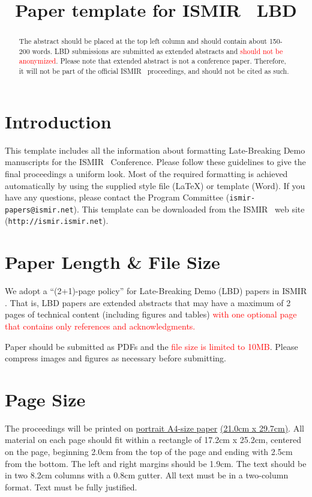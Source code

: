 \documentclass{article}
\title{Paper template for ISMIR \conferenceyear\ LBD}
\begin{document}
%
\maketitle
%
\begin{abstract}
The abstract should be placed at the top left column and should contain about 150-200 words. LBD submissions are submitted as extended abstracts and \textcolor{red}{should not be anonymized}. Please note that extended abstract is not a conference paper. Therefore, it will not be part of the official ISMIR \conferenceyear\ proceedings, and should not be cited as such.
\end{abstract}
%
\section{Introduction}\label{sec:introduction}

This template includes all the information about formatting Late-Breaking Demo manuscripts for the ISMIR \conferenceyear\ Conference. Please follow these guidelines to give the final proceedings a uniform look. Most of the required formatting is achieved automatically by using the supplied
style file (\LaTeX) or template (Word).
If you have any questions, please contact the Program Committee (\texttt{ismir\conferenceyear-papers@ismir.net}).
This template can be downloaded from the ISMIR \conferenceyear\ web site (\texttt{http://ismir\conferenceyear.ismir.net}).
%
\section{Paper Length \& File Size}
We adopt a ``(2+1)-page policy'' for Late-Breaking Demo (LBD) papers in ISMIR \conferenceyear. That is, LBD papers are extended abstracts that may have a maximum of 2 pages of technical content (including figures and tables) \textcolor{red}{with one optional page that contains only references and acknowledgments.}

Paper should be submitted as PDFs and the \textcolor{red}{file size is limited to 10MB}. Please compress images and figures as necessary before submitting.

\section{Page Size}\label{sec:page_size}

The proceedings will be printed on
 \underline{portrait A4-size paper} \underline{(21.0cm x 29.7cm)}.
All material on each page should fit within a rectangle of 17.2cm x 25.2cm,
centered on the page, beginning 2.0cm
from the top of the page and ending with 2.5cm from the bottom.
The left and right margins should be 1.9cm.
The text should be in two 8.2cm columns with a 0.8cm gutter.
All text must be in a two-column format.
Text must be fully justified.
\end{document}
